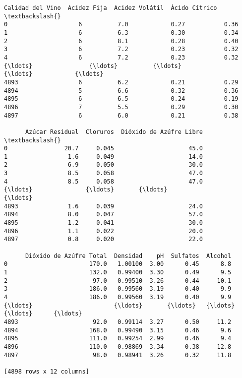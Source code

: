 \documentclass[11pt]{article}
\makeatletter
\newcommand{\boxspacing}{\kern\kvtcb@left@rule\kern\kvtcb@boxsep}
\newcommand{\prompt}[4]{
        {\ttfamily\llap{{\color{#2}[#3]:\hspace{3pt}#4}}\vspace{-\baselineskip}}
    }
\makeatother
\begin{document}
            \begin{tcolorbox}[breakable, size=fbox, boxrule=.5pt, pad at break*=1mm, opacityfill=0]
\prompt{Out}{outcolor}{2}{\boxspacing}
\begin{Verbatim}[commandchars=\\\{\}]
      Calidad del Vino  Acidez Fija  Acidez Volátil  Ácido Cítrico  \textbackslash{}
0                    6          7.0            0.27           0.36
1                    6          6.3            0.30           0.34
2                    6          8.1            0.28           0.40
3                    6          7.2            0.23           0.32
4                    6          7.2            0.23           0.32
{\ldots}                {\ldots}          {\ldots}             {\ldots}            {\ldots}
4893                 6          6.2            0.21           0.29
4894                 5          6.6            0.32           0.36
4895                 6          6.5            0.24           0.19
4896                 7          5.5            0.29           0.30
4897                 6          6.0            0.21           0.38

      Azúcar Residual  Cloruros  Dióxido de Azúfre Libre  \textbackslash{}
0                20.7     0.045                     45.0
1                 1.6     0.049                     14.0
2                 6.9     0.050                     30.0
3                 8.5     0.058                     47.0
4                 8.5     0.058                     47.0
{\ldots}               {\ldots}       {\ldots}                      {\ldots}
4893              1.6     0.039                     24.0
4894              8.0     0.047                     57.0
4895              1.2     0.041                     30.0
4896              1.1     0.022                     20.0
4897              0.8     0.020                     22.0

      Dióxido de Azúfre Total  Densidad    pH  Sulfatos  Alcohol
0                       170.0   1.00100  3.00      0.45      8.8
1                       132.0   0.99400  3.30      0.49      9.5
2                        97.0   0.99510  3.26      0.44     10.1
3                       186.0   0.99560  3.19      0.40      9.9
4                       186.0   0.99560  3.19      0.40      9.9
{\ldots}                       {\ldots}       {\ldots}   {\ldots}       {\ldots}      {\ldots}
4893                     92.0   0.99114  3.27      0.50     11.2
4894                    168.0   0.99490  3.15      0.46      9.6
4895                    111.0   0.99254  2.99      0.46      9.4
4896                    110.0   0.98869  3.34      0.38     12.8
4897                     98.0   0.98941  3.26      0.32     11.8

[4898 rows x 12 columns]
\end{Verbatim}
\end{tcolorbox}
        
\end{document}
